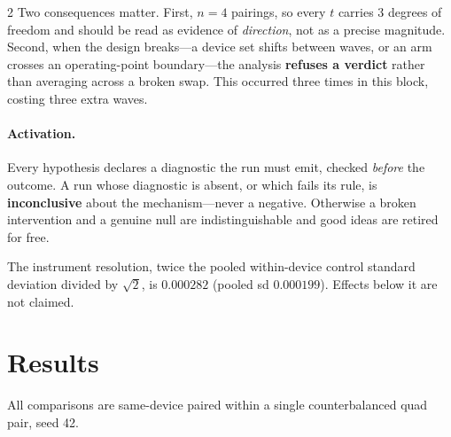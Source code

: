 \documentclass[10pt]{article}
\begin{document}
\begin{multicols}{2}
Two consequences matter. First, $n=4$ pairings, so every $t$ carries 3 degrees of freedom
and should be read as evidence of \emph{direction}, not as a precise magnitude. Second,
when the design breaks---a device set shifts between waves, or an arm crosses an
operating-point boundary---the analysis \textbf{refuses a verdict} rather than averaging
across a broken swap. This occurred three times in this block, costing three extra waves.

\paragraph{Activation.} Every hypothesis declares a diagnostic the run must emit, checked
\emph{before} the outcome. A run whose diagnostic is absent, or which fails its rule, is
\textbf{inconclusive} about the mechanism---never a negative. Otherwise a broken
intervention and a genuine null are indistinguishable and good ideas are retired for free.

The instrument resolution, twice the pooled within-device control standard deviation
divided by $\sqrt{2}$, is $0.000282$ (pooled sd $0.000199$). Effects below it are not
claimed.

\section{Results}
\label{sec:results}

All comparisons are same-device paired within a single counterbalanced quad pair, seed 42.


\end{multicols}
\end{document}
